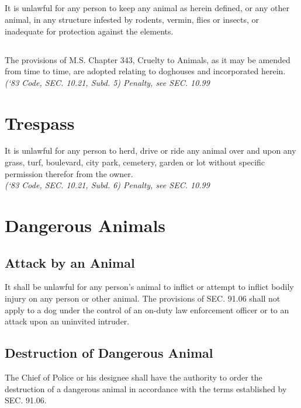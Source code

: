 \subsection{}
It is unlawful for any person to keep any animal as herein defined, or any other animal, in any structure infested by rodents, vermin, flies or insects, or inadequate for protection against the elements.
\subsection{}
The provisions of M.S. Chapter 343, Cruelty to Animals, as it may be amended from time to time, are adopted relating to doghouses and incorporated herein.\\
\emph{(‘83 Code, SEC. 10.21, Subd. 5)  Penalty, see SEC. 10.99}

\section{Trespass}
It is unlawful for any person to herd, drive or ride any animal over and upon any grass, turf, boulevard, city park, cemetery, garden or lot without specific permission therefor from the owner.\\
\emph{(‘83 Code, SEC. 10.21, Subd. 6)  Penalty, see SEC. 10.99}

\section{Dangerous Animals}
\subsection{Attack by an Animal}
It shall be unlawful for any person’s animal to inflict or attempt to inflict bodily injury on any person or other animal. The provisions of SEC. 91.06 shall not apply to a dog under the control of an on-duty law enforcement officer or to an attack upon an uninvited intruder.
\subsection{Destruction of Dangerous Animal}
The Chief of Police or his designee shall have the authority to order the destruction of a dangerous animal in accordance with the terms established by SEC. 91.06.
